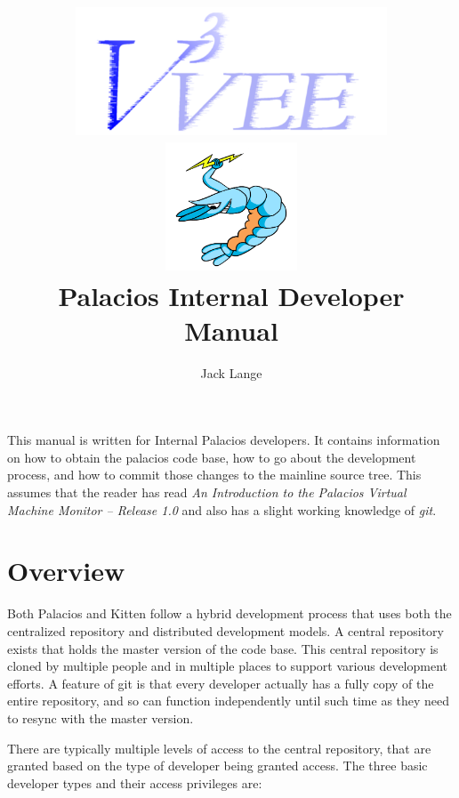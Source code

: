 \documentclass[11pt]{article}
\begin{document}
\title{
\includegraphics[height=1.5in]{v3vee.pdf}
\includegraphics[height=1.5in]{logo6.png} \\
\vspace{0.5in} 
Palacios Internal Developer Manual
}
\author{Jack Lange}

\maketitle


This manual is written for Internal Palacios developers. It contains
information on how to obtain the palacios code base, how to go about
the development process, and how to commit those changes to the
mainline source tree.  This assumes that the reader has read {\em An
Introduction to the Palacios Virtual Machine Monitor -- Release 1.0}
and also has a slight working knowledge of {\em git}.


\section{Overview}


Both Palacios and Kitten follow a hybrid development process that
uses both the centralized repository and distributed development
models. A central repository exists that holds the master version of
the code base. This central repository is cloned by multiple people
and in multiple places to support various development efforts. A
feature of git is that every developer actually has a fully copy of
the entire repository, and so can function independently until such
time as they need to resync with the master version. 

There are typically multiple levels of access to the central
repository, that are granted based on the type of developer being
granted access. The three basic developer types and their access
privileges are:
\end{document}
